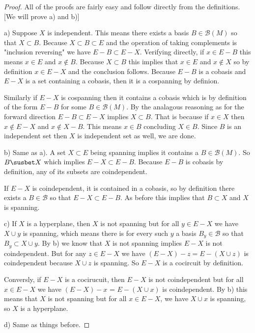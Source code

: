 \begin{proof}
    All of the proofs are fairly easy and follow directly from the definitions. [We will prove a) and b)]

    a) Suppose $X$ is independent. This means there exists a basis $B \in \mathcal{B}(M)$ so that $X \subset B$. Because $X \subset B \subset E$ and the operation of taking complements is "inclusion reversing" we have $E-B \subset E - X$. Verifying directly, if $x \in E - B$ this means $x \in E$ and $x \notin B$. Because $X \subset B$ this implies that $x \in E$ and $x \notin X$ so by definition $x \in E - X$ and the conclusion follows. Because $E - B$ is a cobasis and $E - X$ is a set containing a cobasis, then it is a cospanning by definion.

    Similarly if $E - X$ is cospanning then it contains a cobasis which is by definition of the form $E - B$ for some $B \in \mathcal{B}(M)$. By the analagous reasoning as for the forward direction $E - B \subset E - X$ implies $X \subset B$. That is because if $x \in X$ then $x \notin E - X$ and $x \notin X - B$. This means $x \in B$ concluding $X \in B$. Since $B$ is an independent set then $X$ is independent set as well, we are done.

    b) Same as a). A set $X\subset E$ being spanning implies it contains a $B \in \mathcal{B}(M)$. So  $B \susbet X$ which implies $E - X \subset E - B$. Because $E - B$ is cobasis by definition, any of its subsets are coindependent. 

    If $E - X$ is coindependent, it is contained in a cobasis, so by definition there exists a $B \in \mathcal{B}$ so that $E - X \subset E - B$. As before this implies that $B \subset X$ and $X$ is spanning.

    c)  If $X$ is a hyperplane, then $X$ is not spanning but for all $y \in E - X$ we have $X \cup y$ is spanning, which means there is for every such $y$ a basis $B_y \in \mathcal{B}$ so that $B_y \subset X \cup y $. By b) we know that $X$ is not spanning implies $E - X$ is not coindependent. But for any $z \in E - X$ we have $(E-X)-z = E - (X \cup z)$ is coindependent because $X \cup z$ is spanning. So $E - X$ is a cocircuit by definition.

    Conversly, if $E - X$ is a cocirucuit, then $E-X$ is not coindependent but for all $x \in E - X$ we have $(E - X) - x$ = $E - (X \cup x)$ is coindependent. By b) this means that $X$ is not spanning but for all $x \in E-X$, we have $X \cup x$ is spanning, so $X$ is a hyperplane.

    d) Same as things before.
    
\end{proof}



